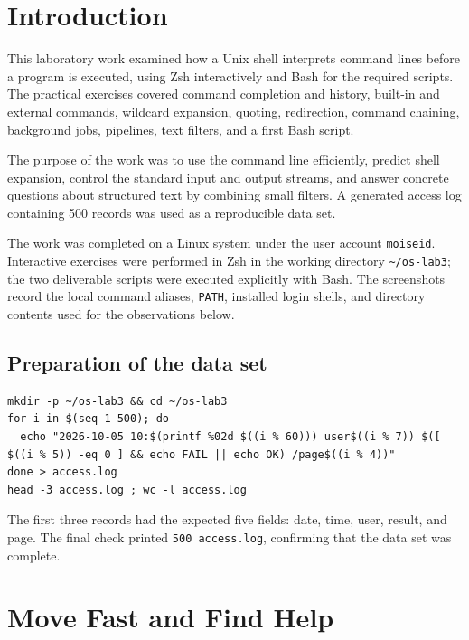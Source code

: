 \documentclass[12pt,a4paper]{article}
\begin{document}
\setcounter{page}{2}
\tableofcontents
\newpage

\section*{Introduction}

This laboratory work examined how a Unix shell interprets command lines before a program is executed, using Zsh interactively and Bash for the required scripts. The practical exercises covered command completion and history, built-in and external commands, wildcard expansion, quoting, redirection, command chaining, background jobs, pipelines, text filters, and a first Bash script.

The purpose of the work was to use the command line efficiently, predict shell expansion, control the standard input and output streams, and answer concrete questions about structured text by combining small filters. A generated access log containing 500 records was used as a reproducible data set.

The work was completed on a Linux system under the user account \texttt{moiseid}. Interactive exercises were performed in Zsh in the working directory \texttt{\textasciitilde/os-lab3}; the two deliverable scripts were executed explicitly with Bash. The screenshots record the local command aliases, \texttt{PATH}, installed login shells, and directory contents used for the observations below.

\subsection*{Preparation of the data set}

\begin{lstlisting}
mkdir -p ~/os-lab3 && cd ~/os-lab3
for i in $(seq 1 500); do
  echo "2026-10-05 10:$(printf %02d $((i % 60))) user$((i % 7)) $([ $((i % 5)) -eq 0 ] && echo FAIL || echo OK) /page$((i % 4))"
done > access.log
head -3 access.log ; wc -l access.log
\end{lstlisting}

The first three records had the expected five fields: date, time, user, result, and page. The final check printed \texttt{500 access.log}, confirming that the data set was complete.

\newpage
\section{Move Fast and Find Help}
\end{document}
